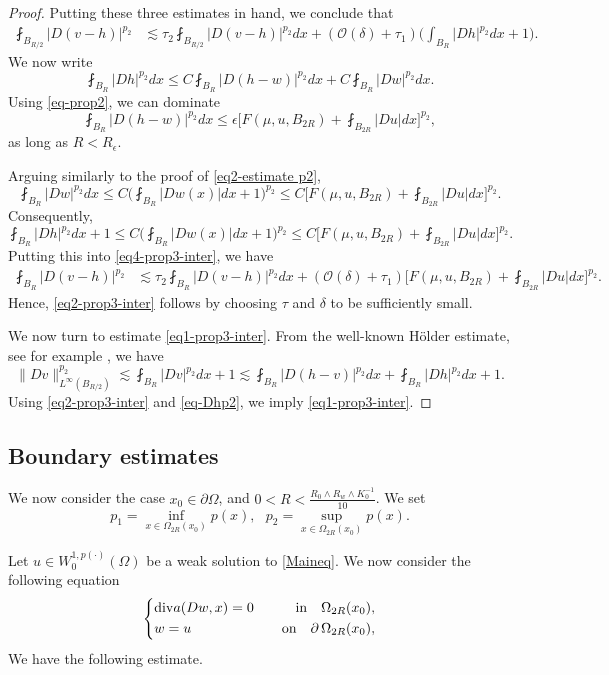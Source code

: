 \documentclass[a4paper,10pt]{amsart}
\newcommand{\lesi}{\lesssim}
\newcommand{\f}{\frac}
\newcommand{\Om}{\Omega}
\newcommand{\vc}{\infty}
\newcommand{\di}{{\rm div}}
\begin{document}
\begin{proof}
	Putting these three estimates in hand, we conclude that
	\begin{equation}\label{eq4-prop3-inter}
	\begin{aligned}
	\fint_{B_{R/2}}|D(v-h)|^{p_2}
	&\lesi \tau_2 \fint_{B_{R/2}}|D(v-h)|^{p_2}dx+(\mathcal{O}(\delta)+\tau_1)\Big(\int_{B_R}|Dh|^{p_2}dx +1\Big).
	\end{aligned}
	\end{equation}
	We now write
	$$
	\fint_{B_R}|Dh|^{p_2}dx\leq C\fint_{B_R}|D(h-w)|^{p_2}dx+C\fint_{B_R}|Dw|^{p_2}dx.	
	$$
	Using \eqref{eq-prop2}, we can dominate
	$$
	\fint_{B_R}|D(h-w)|^{p_2}dx\leq \epsilon  \Big[F(\mu,u,B_{2R})+\fint_{B_{2R}}|Du|dx\Big]^{p_2}, 
	$$
	as long as $R<R_{\epsilon}$.
	
	
	Arguing similarly to the proof of \eqref{eq2-estimate p2},
	$$
	\fint_{B_R}|Dw|^{p_2}dx\leq C \Big(\fint_{B_R}|Dw(x)|dx +1\Big)^{p_2}\leq C\Big[F(\mu,u,B_{2R})+\fint_{B_{2R}}|Du|dx\Big]^{p_2}. 
	$$
	Consequently,
	\begin{equation}\label{eq-Dhp2}
	\fint_{B_R}|Dh|^{p_2}dx +1\leq C  \Big(\fint_{B_R}|Dw(x)|dx +1\Big)^{p_2}\leq C \Big[F(\mu,u,B_{2R})+\fint_{B_{2R}}|Du|dx\Big]^{p_2}.
	\end{equation}
	Putting this into \eqref{eq4-prop3-inter}, we have
	$$
	\begin{aligned}
	\fint_{B_{R}}|D(v-h)|^{p_2}	&\lesi \tau_2 \fint_{B_{R}}|D(v-h)|^{p_2}dx+(\mathcal{O}(\delta)+\tau_1)\Big[F(\mu,u,B_{2R})+\fint_{B_{2R}}|Du|dx\Big]^{p_2}.	
	\end{aligned}
	$$
	Hence, \eqref{eq2-prop3-inter} follows by choosing $\tau$ and $\delta$ to be sufficiently small.
	\medskip
	
	We now turn to estimate \eqref{eq1-prop3-inter}.
	From the well-known H\"older estimate, see for example \cite{L1, L2}, we have
	$$
	\|Dv\|_{L^\vc(B_{R/2})}^{p_2}\lesi\fint_{B_R}|Dv|^{p_2}dx +1 \lesi \fint_{B_R}|D(h-v)|^{p_2}dx+ \fint_{B_R}|Dh|^{p_2}dx+1. 
	$$
	Using \eqref{eq2-prop3-inter} and \eqref{eq-Dhp2}, we imply \eqref{eq1-prop3-inter}.
\end{proof}

\subsection{Boundary estimates}
We now consider the case $x_0\in \partial\Om$, and $0<R<\f{R_0\wedge R_w\wedge K_0^{-1}}{10}$. We set 
$$
p_1=\inf_{x\in \Om_{2R}(x_0)}p(x), \ \ \ p_2=\sup_{x\in \Om_{2R}(x_0)}p(x).
$$

Let $u\in W^{1,p(\cdot)}_0(\Om)$ be a weak solution to \eqref{Maineq}. We now consider the following equation
\begin{equation}\label{eq1-boundary}
\left\{
\begin{aligned}
&\di a(Dw, x)=0 \quad &\text{in} \quad \Om_{2R}(x_0),\\
&w=u  \quad &\text{on} \quad \partial \,\Om_{2R}(x_0),
\end{aligned}
\right.
\end{equation}
We have the following estimate.
\end{document}
